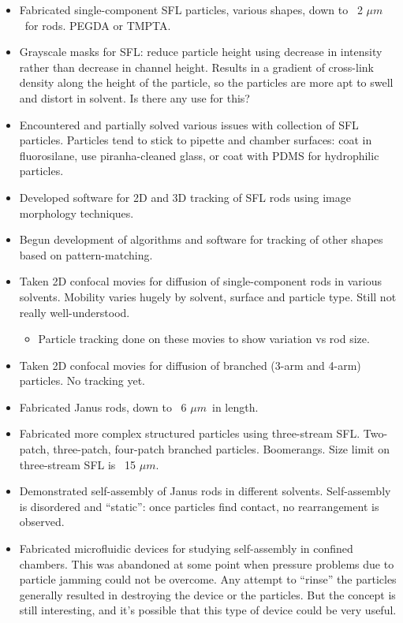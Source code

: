 \documentclass[11pt]{article}
\newcommand{\microns}{$\mu m$}
\begin{document}
\begin{itemize}

\item Fabricated single-component SFL particles, various shapes, down to ~2 \microns\  for rods. PEGDA or TMPTA.

\item Grayscale masks for SFL: reduce particle height using decrease in intensity rather than decrease in channel height.  Results in a gradient of cross-link density along the height of the particle, so the particles are more apt to swell and distort in solvent.
Is there any use for this?

\item Encountered and partially solved various issues with collection of SFL particles.  Particles tend to stick to pipette and chamber surfaces: coat in fluorosilane, use piranha-cleaned glass, or coat with PDMS for hydrophilic particles.

\item Developed software for 2D and 3D tracking of SFL rods using image morphology techniques.

\item Begun development of algorithms and software for tracking of other shapes based on pattern-matching.

\item Taken 2D confocal movies for diffusion of single-component rods in various solvents. Mobility varies hugely by solvent, surface and particle type.  Still not really well-understood.
\begin{itemize} \item Particle tracking done on these movies to show variation vs rod size. \end{itemize}

\item Taken 2D confocal movies for diffusion of branched (3-arm and 4-arm) particles. No tracking yet.

\item Fabricated Janus rods, down to ~6 \microns\ in length.

\item Fabricated more complex structured particles using three-stream SFL. Two-patch, three-patch, four-patch branched particles.  Boomerangs. Size limit on three-stream SFL is ~15 \microns.

\item Demonstrated self-assembly of Janus rods in different solvents. Self-assembly is disordered and ``static'': once particles find contact, no rearrangement is observed.

\item Fabricated microfluidic devices for studying self-assembly in confined chambers.  This was abandoned at some point when pressure problems due to particle jamming could not be overcome. Any attempt to 
``rinse'' the particles generally resulted in destroying the device or the particles.  But the concept is still interesting, and it's possible that this type of device could be very useful.

\end{itemize}
\end{document}

